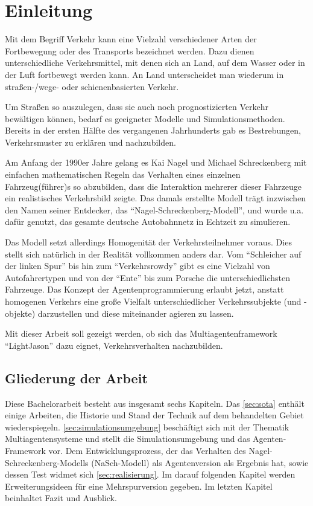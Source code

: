 \section{Einleitung}
\label{sec:einleitung}

Mit dem Begriff Verkehr kann eine Vielzahl verschiedener Arten der Fortbewegung oder des Transports bezeichnet werden. 
Dazu dienen unterschiedliche Verkehrsmittel, mit denen sich an Land, auf dem Wasser oder in der Luft fortbewegt werden kann.
An Land unterscheidet man wiederum in \mbox{straßen-/}wege- oder schienenbasierten Verkehr.

Um Straßen so auszulegen, dass sie auch noch prognostizierten Verkehr bewältigen können, bedarf es geeigneter Modelle und Simulationsmethoden.
Bereits in der ersten Hälfte des  vergangenen Jahrhunderts gab es Bestrebungen, Verkehrsmuster zu erklären und nachzubilden.

Am Anfang der 1990er Jahre gelang es Kai Nagel und Michael Schreckenberg mit einfachen mathematischen Regeln das Verhalten eines einzelnen Fahrzeug(führer)s so abzubilden, dass die Interaktion mehrerer dieser Fahrzeuge ein realistisches Verkehrsbild zeigte.
Das damals erstellte Modell trägt inzwischen den Namen seiner Entdecker, das \enquote{Nagel-Schreckenberg-Modell}, und wurde u.a. dafür genutzt, das gesamte deutsche Autobahnnetz in Echtzeit zu simulieren.

Das Modell setzt allerdings Homogenität der Verkehrsteilnehmer voraus. 
Dies stellt sich natürlich in der Realität vollkommen anders dar.
Vom \enquote{Schleicher auf der linken Spur} bis hin zum \enquote{Verkehrsrowdy} gibt es eine Vielzahl von Autofahrertypen und von der \enquote{Ente} bis zum Porsche die unterschiedlichsten Fahrzeuge.
Das Konzept der Agentenprogrammierung erlaubt jetzt, anstatt homogenen Verkehrs eine große Vielfalt unterschiedlicher Verkehrssubjekte (und -objekte) darzustellen und diese miteinander agieren zu lassen.

Mit dieser Arbeit soll gezeigt werden, ob sich das Multiagentenframework \enquote{LightJason} dazu eignet, Verkehrsverhalten nachzubilden.



\subsection{Gliederung der Arbeit}
\label{sec:gliederung}

Diese Bachelorarbeit besteht aus insgesamt sechs Kapiteln.
Das \cref{sec:sota} enthält einige Arbeiten, die Historie und Stand der Technik auf dem behandelten Gebiet wiederspiegeln.
\cref{sec:simulationsumgebung} beschäftigt sich mit der Thematik Multiagentensysteme und stellt die Simulationsumgebung und das Agenten-Framework vor.
Dem Entwicklungsprozess, der das Verhalten des Nagel-Schreckenberg-Modells (NaSch-Modell) als Agentenversion als Ergebnis hat, sowie dessen Test widmet sich \cref{sec:realisierung}.
Im darauf folgenden Kapitel werden Erweiterungsideen für eine Mehrspurversion gegeben.
Im letzten Kapitel beinhaltet Fazit und Ausblick.
